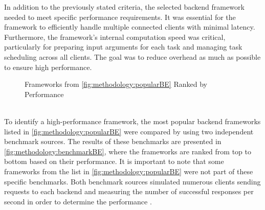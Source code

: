 In addition to the previously stated criteria, the selected backend framework needed to meet specific performance requirements. It was essential for the framework to efficiently handle multiple connected clients with minimal latency. Furthermore, the framework's internal computation speed was critical, particularly for preparing input arguments for each task and managing task scheduling across all clients. The goal was to reduce overhead as much as possible to ensure high performance.
\begin{figure}[htbp]
  \myfloatalign
  \caption{Frameworks from \autoref{fig:methodology:popularBE} Ranked by Performance}
  \label{fig:methodology:benchmarkBE}
\end{figure}
~\\
To identify a high-performance framework, the most popular backend frameworks listed in \autoref{fig:methodology:popularBE} were compared by using two independent benchmark sources. The results of these benchmarks are presented in \autoref{fig:methodology:benchmarkBE}, where the frameworks are ranked from top to bottom based on their performance. It is important to note that some frameworks from the list in \autoref{fig:methodology:popularBE} were not part of these specific benchmarks. Both benchmark sources simulated numerous clients sending requests to each backend and measuring the number of successful responses per second in order to determine the performance \cite{backend:benchmark1, backend:benchmark2}.
